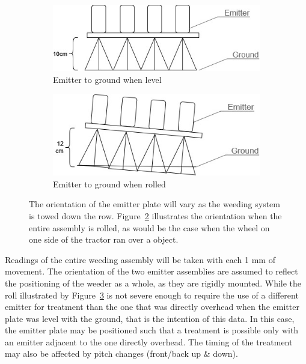 \documentclass[12pt]{article}
\begin{document}
\begin{figure}[t!]
	\centering
	\begin{subfigure}[t]{.38\textwidth}
		\centering
		\includegraphics[width=1\linewidth]{./figures/emitter-to-ground-angle.jpg}
		\caption{Emitter to ground when level}
		\label{fig:emitter-level}
	\end{subfigure}
	\hspace{1em}%
	\begin{subfigure}[t]{.38\textwidth}
		\centering
		\includegraphics[width=1\linewidth]{./figures/emitter-to-ground-angle-rolled.jpg}
		\caption{Emitter to ground when rolled}
		\label{fig:emitter-rolled}
	\end{subfigure}
	\caption[Emitter plate orientation with respect to ground]{The orientation of the emitter plate will vary as the weeding system is towed down the row.  Figure~\ref{fig:emitter-rolled} illustrates the orientation when the entire assembly is rolled, as would be the case when the wheel on one side of the tractor ran over a object.}
	\label{fig:emitter-orientation}
\end{figure}



Readings of the entire weeding assembly will be taken with each 1 mm of movement. The orientation of the two emitter assemblies are assumed to reflect the positioning of the weeder as a whole, as they are rigidly mounted. While the roll illustrated by Figure~\ref{fig:emitter-orientation} is not severe enough to require the use of a different emitter for treatment than the one that was directly overhead when the emitter plate was level with the ground, that is the intention of this data. In this case, the emitter plate may be positioned such that a treatment is possible only with an emitter adjacent to the one directly overhead. The timing of the treatment may also be affected by pitch changes (front/back up \& down).
\end{document}
